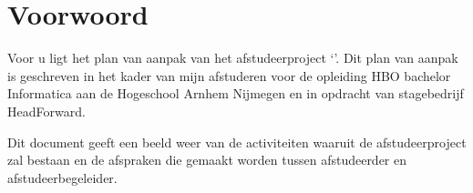 \chapter{Voorwoord}
Voor u ligt het plan van aanpak van het afstudeerproject ‘\thesisTitle’. Dit plan van aanpak is geschreven in het kader van mijn afstuderen voor de opleiding HBO bachelor Informatica aan de Hogeschool Arnhem Nijmegen en in opdracht van stagebedrijf HeadForward.\par
Dit document geeft een beeld weer van de activiteiten waaruit de afstudeerproject zal bestaan en de afspraken die gemaakt worden tussen afstudeerder en afstudeerbegeleider.
